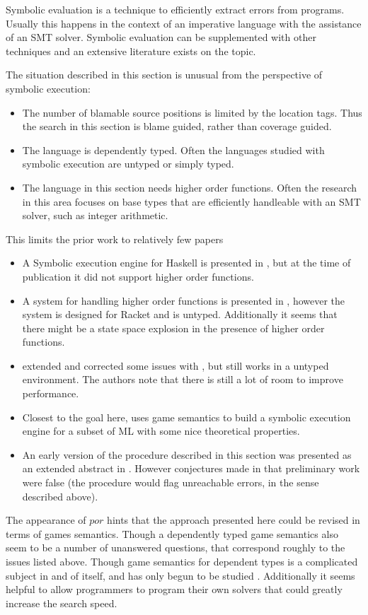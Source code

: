 Symbolic evaluation is a technique to efficiently extract errors from programs.
Usually this happens in the context of an imperative language with the assistance of an SMT solver.
Symbolic evaluation can be supplemented with other techniques and an extensive literature exists on the topic.
 
The situation described in this section is unusual from the perspective of symbolic execution:
\begin{itemize}
\item The number of blamable source positions is limited by the location tags.
Thus the search in this section is blame guided, rather than coverage guided.
\item The language is dependently typed.
Often the languages studied with symbolic execution are untyped or simply typed.
\item The language in this section needs higher order functions.
Often the research in this area focuses on base types that are efficiently handleable with an SMT solver, such as integer arithmetic.
\end{itemize}
This limits the prior work to relatively few papers
\begin{itemize}
\item
A Symbolic execution engine for Haskell is presented in \cite{10.1145/3314221.3314618}, but at the time of publication it did not support higher order functions.
\item
A system for handling higher order functions is presented in \cite{nguyen2017higher}, however the system is designed for Racket and is untyped.
Additionally it seems that there might be a state space explosion in the presence of higher order functions.
\item \cite{10.1007/978-3-030-72019-3_23} extended and corrected some issues with \cite{nguyen2017higher}, but still works in a untyped environment.
The authors note that there is still a lot of room to improve performance.
\item Closest to the goal here, \cite{lin_et_al:LIPIcs:2020:12349} uses game semantics to build a symbolic execution engine for a subset of ML with some nice theoretical properties.
\item An early version of the procedure described in this section was presented as an extended abstract in \cite{extendedabstract}.
However conjectures made in that preliminary work were false (the procedure would flag unreachable errors, in the sense described above).
\end{itemize}
The appearance of $por$ hints that the approach presented here could be revised in terms of games semantics.
Though a dependently typed game semantics also seem to be a number of unanswered questions, that correspond roughly to the issues listed above.
Though game semantics for dependent types is a complicated subject in and of itself, and has only begun to be studied \cite{VAKAR2018401}.
Additionally it seems helpful to allow programmers to program their own solvers that could greatly increase the search speed.
